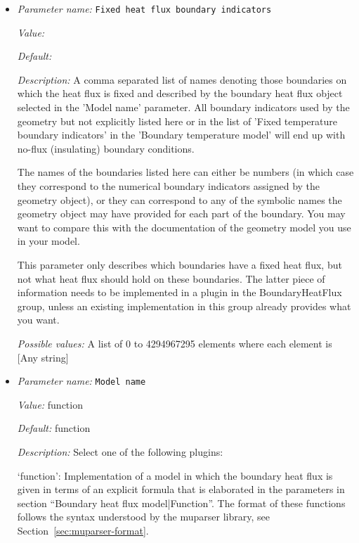 \begin{itemize}
\item {\it Parameter name:} {\tt Fixed heat flux boundary indicators}
\label{parameters:Boundary heat flux model/Fixed heat flux boundary indicators}


{\it Value:} 


{\it Default:} 


{\it Description:} A comma separated list of names denoting those boundaries on which the heat flux is fixed and described by the boundary heat flux object selected in the 'Model name' parameter. All boundary indicators used by the geometry but not explicitly listed here or in the list of 'Fixed temperature boundary indicators' in the 'Boundary temperature model' will end up with no-flux (insulating) boundary conditions.

The names of the boundaries listed here can either be numbers (in which case they correspond to the numerical boundary indicators assigned by the geometry object), or they can correspond to any of the symbolic names the geometry object may have provided for each part of the boundary. You may want to compare this with the documentation of the geometry model you use in your model.

This parameter only describes which boundaries have a fixed heat flux, but not what heat flux should hold on these boundaries. The latter piece of information needs to be implemented in a plugin in the BoundaryHeatFlux group, unless an existing implementation in this group already provides what you want.


{\it Possible values:} A list of 0 to 4294967295 elements where each element is [Any string]
\item {\it Parameter name:} {\tt Model name}
\label{parameters:Boundary heat flux model/Model name}


{\it Value:} function


{\it Default:} function


{\it Description:} Select one of the following plugins:

`function': Implementation of a model in which the boundary heat flux is given in terms of an explicit formula that is elaborated in the parameters in section ``Boundary heat flux model|Function''. The format of these functions follows the syntax understood by the muparser library, see Section~\ref{sec:muparser-format}.


\end{itemize}
